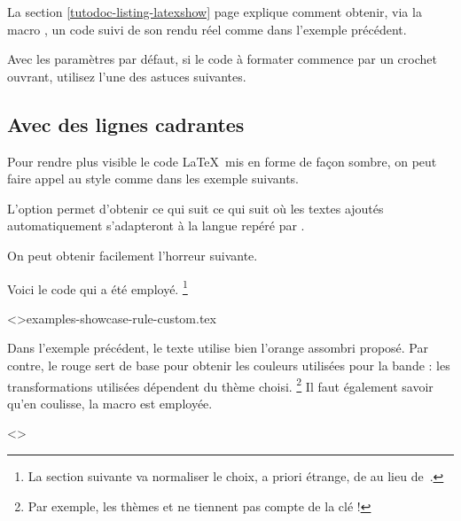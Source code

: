 \begin{tdocrem}
    La section \ref{tutodoc-listing-latexshow} page \pageref{tutodoc-listing-latexshow} explique comment obtenir, via la macro , un code suivi de son rendu réel comme dans l'exemple précédent.
\end{tdocrem}


\begin{tdocwarn}
    Avec les paramètres par défaut, si le code à formater commence par un crochet ouvrant, utilisez l'une des astuces suivantes.

\end{tdocwarn}


\subsection{Avec des lignes cadrantes}

Pour rendre plus visible le code \LaTeX\ mis en forme de façon sombre, on peut faire appel au style  comme dans les exemple suivants.


\begin{tdocexa}
	L'option  permet d'obtenir ce qui suit ce qui suit où les textes ajoutés automatiquement s'adapteront à la langue repéré par \thisproj.

	
\end{tdocexa}


\begin{tdocexa}
	On peut obtenir facilement l'horreur suivante.

	
	
	Voici le code qui a été employé.%
	\footnote{
		La section suivante va normaliser le choix, a priori étrange, de  au lieu de \,.
	}

	\tdoclatexinput<>{examples-showcase-rule-custom.tex}
\end{tdocexa}


\begin{tdocnote}
    Dans l'exemple précédent, le texte utilise bien l'orange assombri proposé. Par contre, le rouge sert de base pour obtenir les couleurs utilisées pour la bande : les transformations utilisées dépendent du thème choisi.%
    \footnote{
        Par exemple, les thèmes  et  ne tiennent pas compte de la clé  !
    }
    Il faut également savoir qu'en coulisse, la macro  est employée.

    \begin{tdoclatex}<>
    \end{tdoclatex}
\end{tdocnote}



